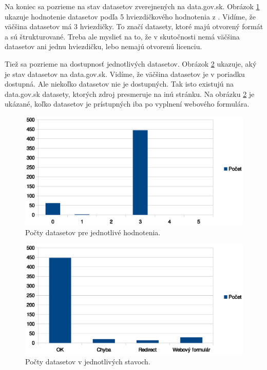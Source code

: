 \documentclass[12pt,a4paper]{article}
\begin{document}
Na koniec sa pozrieme na stav datasetov zverejnených na data.gov.sk. Obrázok \ref{stars} ukazuje hodnotenie datasetov podľa 5 hviezdičkového hodnotenia z \cite{5star}. Vidíme, že väčšina datasetov má 3 hviezdičky. To značí datasety, ktoré majú otvorený formát a sú štrukturované. Treba ale myslieť na to, že v skutočnosti nemá väčšina datasetov ani jednu hviezdičku, lebo nemajú otvorenú licenciu.

Tiež sa pozrieme na dostupnosť jednotlivých datasetov. Obrázok \ref{status} ukazuje, aký je stav datasetov na data.gov.sk. Vidíme, že väčšina datasetov je v poriadku dostupná. Ale niekoľko datasetov nie je dostupných. Tak isto existujú na data.gov.sk datasety, ktorých zdroj presmeruje na inú stránku. Na obrázku \ref{status} je ukázané, koľko datasetov je prístupných iba po vyplnení webového formulára.

\begin{figure}
\center \includegraphics[width=14cm]{stars}
\caption{Počty datasetov pre jednotlivé hodnotenia.}
\label{stars}
\end{figure}

\begin{figure}
\center \includegraphics[width=14cm]{status}
\caption{Počty datasetov v jednotlivých stavoch.}
\label{status}
\end{figure}
\end{document}
